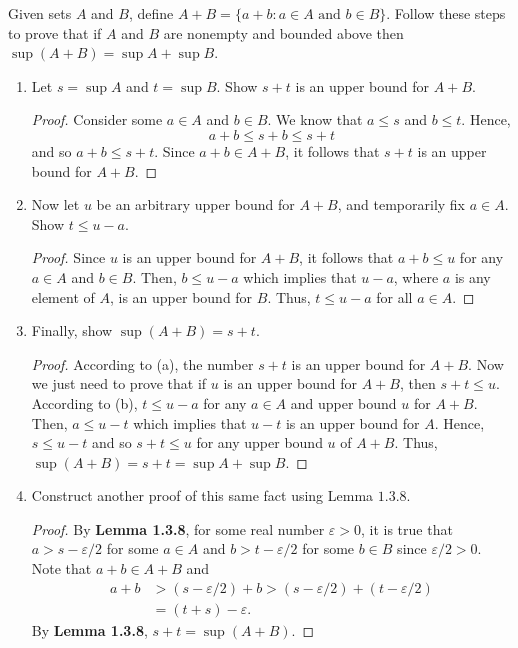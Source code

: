 \documentclass[12pt]{article}
\newenvironment{problem}[2][Problem]{\begin{trivlist}
		\item[\hskip \labelsep {\bfseries #1}\hskip \labelsep {\bfseries #2.}]}{\end{trivlist}}
\begin{document}
		\begin{problem}{1.3.6}
			Given sets $A$ and $B$, define $A+B = \{a+b:a\in A \text{ and } b\in B\}$. Follow these steps to prove that if $A$ and $B$ are nonempty and bounded above then $\sup(A+B) = \sup A + \sup B$.
			\begin{enumerate}[label=(\alph*)]
				\item Let $s=\sup A$ and  $t=\sup B$. Show $s+t$ is an upper bound for $A+B$.
				\begin{proof}
					Consider some $a\in A$ and $b\in B$. We know that $a\leq s$ and $b\leq t$. Hence,
					\begin{equation*}
						a+b\leq s+b \leq s+t
					\end{equation*}
				and so $a+b\leq s+t$. Since $a+b\in A+B$, it follows that $s+t$ is an upper bound for $A+B$.
				\end{proof}
				\item Now let $u$ be an arbitrary upper bound for $A+B$, and temporarily fix $a\in A$. Show $t\leq u-a$.
				\begin{proof}
					Since $u$ is an upper bound for $A+B$, it follows that $a+b\leq u$ for any $a\in A$ and $b\in B$. Then, $b \leq u-a$ which implies that $u-a$, where $a$ is any element of $A$, is an upper bound for $B$. Thus, $t\leq u-a$ for all $a\in A$. 
				\end{proof}
				\item Finally, show $\sup(A+B)=s+t$.
				\begin{proof}
					According to (a), the number $s+t$ is an upper bound for $A+B$. Now we just need to prove that if $u$ is an upper bound for $A+B$, then $s+t\leq u$.\\
					According to (b), $t\leq u-a$ for any $a\in A$ and upper bound $u$ for $A+B$. Then, $a\leq u-t$ which implies that $u-t$ is an upper bound for $A$. Hence, $s\leq u-t$ and so $s+t\leq u$ for any upper bound $u$ of $A+B$. Thus, $\sup(A+B) = s+t = \sup A + \sup B$.
				\end{proof}
				\item Construct another proof of this same fact using Lemma $1.3.8$.
				\begin{proof}
					By \textbf{Lemma 1.3.8}, for some real number $\varepsilon > 0$, it is true that $a>s-\varepsilon/2$ for some $a\in A$ and $b>t-\varepsilon/2$ for some $b\in B$ since $\varepsilon/2 > 0$. Note that $a+b\in A+B$ and 
					\begin{align*}
						a+b &> (s-\varepsilon/2) +b > (s-\varepsilon/2) + (t-\varepsilon/2)\\
						&= (t+s)-\varepsilon.
					\end{align*}
				By \textbf{Lemma 1.3.8}, $s+t = \sup (A+B)$.
				\end{proof}
			\end{enumerate}
		\end{problem}
\end{document}
